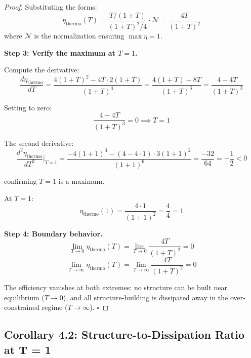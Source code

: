 \documentclass[11pt,a4paper]{article}
\begin{document}
\begin{proof}
Substituting the forms:
\begin{equation}
\eta_{\text{thermo}}(T) = \frac{T/(1+T)}{(1+T)^2/4} \cdot \mathcal{N} = \frac{4T}{(1+T)^2}
\end{equation}
where $\mathcal{N}$ is the normalization ensuring $\max \eta = 1$.

\textbf{Step 3: Verify the maximum at $T = 1$.}

Compute the derivative:
\begin{equation}
\frac{d\eta_{\text{thermo}}}{dT} = \frac{4(1+T)^2 - 4T \cdot 2(1+T)}{(1+T)^4} = \frac{4(1+T) - 8T}{(1+T)^3} = \frac{4 - 4T}{(1+T)^3}
\end{equation}

Setting to zero:
\begin{equation}
\frac{4 - 4T}{(1+T)^3} = 0 \implies T = 1
\end{equation}

The second derivative:
\begin{equation}
\frac{d^2\eta_{\text{thermo}}}{dT^2}\bigg|_{T=1} = \frac{-4(1+1)^3 - (4-4\cdot 1) \cdot 3(1+1)^2}{(1+1)^6} = \frac{-32}{64} = -\frac{1}{2} < 0
\end{equation}

 confirming $T = 1$ is a maximum.

At $T = 1$:
\begin{equation}
\eta_{\text{thermo}}(1) = \frac{4 \cdot 1}{(1+1)^2} = \frac{4}{4} = 1
\end{equation}

\textbf{Step 4: Boundary behavior.}
\begin{equation}
\lim_{T \to 0} \eta_{\text{thermo}}(T) = \lim_{T \to 0} \frac{4T}{(1+T)^2} = 0
\end{equation}
\begin{equation}
\lim_{T \to \infty} \eta_{\text{thermo}}(T) = \lim_{T \to \infty} \frac{4T}{(1+T)^2} = 0
\end{equation}

The efficiency vanishes at both extremes: no structure can be built near equilibrium ($T \to 0$), and all structure-building is dissipated away in the over-constrained regime ($T \to \infty$). \hfill $\square$
\end{proof}

\subsection{Corollary 4.2: Structure-to-Dissipation Ratio at T = 1}
\end{document}
